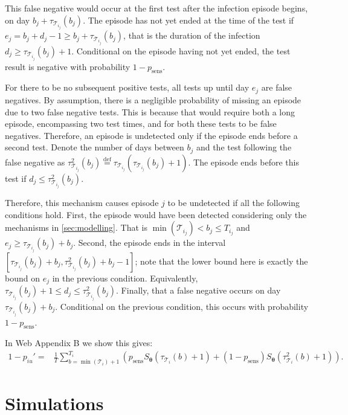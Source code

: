 \documentclass[referee,useAMS,usenatbib]{biom}
\renewcommand{\vec}[1]{\bm{#1}}
\newcommand{\psens}{p_\text{sens}}
\newcommand{\sched}{\mathcal{T}}
\begin{document}
This false negative would occur at the first test after the infection episode begins, on day $b_j + \tau_{\sched_{i_j}}(b_j)$.
The episode has not yet ended at the time of the test if $e_j = b_j + d_j - 1 \geq b_j + \tau_{\sched_{i_j}}(b_j)$, that is the duration of the infection $d_j \geq \tau_{\sched_{i_j}}(b_j) + 1$.
Conditional on the episode having not yet ended, the test result is negative with probability $1 - \psens$.

For there to be no subsequent positive tests, all tests up until day $e_j$ are false negatives.
By assumption, there is a negligible probability of missing an episode due to two false negative tests.
This is because that would require both a long episode, encompassing two test times, and for both these tests to be false negatives.
Therefore, an episode is undetected only if the episode ends before a second test.
Denote the number of days between $b_j$ and the test following the false negative as $\tau^2_{\sched_{i_j}}(b_j) \stackrel{\text{def}}{=} \tau_{\sched_{i_j}}(\tau_{\sched_{i_j}}(b_j) + 1)$.
The episode ends before this test if $d_j \leq \tau^2_{\sched_{i_j}}(b_j)$.

Therefore, this mechanism causes episode $j$ to be undetected if all the following conditions hold.
First, the episode would have been detected considering only the mechanisms in \cref{sec:modelling}.
That is $\min(\sched_{i_j}) < b_j \leq T_{i_j}$ and $e_j \geq \tau_{\sched_{i_j}}(b_j) + b_j$.
Second, the episode ends in the interval $[\tau_{\sched_{i_j}}(b_j) + b_j, \tau^2_{\sched_{i_j}}(b_j) + b_j - 1]$; note that the lower bound here is exactly the bound on $e_j$ in the previous condition.
Equivalently, $\tau_{\sched_{i_j}}(b_j) + 1 \leq d_j \leq \tau^2_{\sched_{i_j}}(b_j)$.
Finally, that a false negative occurs on day $\tau_{\sched_{i_j}}(b_j) + b_j$. Conditional on the previous condition, this occurs with probability $1 - \psens$.

In Web Appendix B we show this gives:
\begin{align}
1 - p_{iu}'
=& \frac{1}{T} \sum_{b=\min(\sched_{i}) + 1}^{T_{i}} \left( p_\text{sens} S_{\vec{\theta}}(\tau_{\sched_{i}}(b) + 1) + (1 - p_\text{sens}) S_{\vec{\theta}}(\tau^2_{\sched_{i}}(b) + 1)\right).
\label{imperf-test:eq:pit-prime}
\end{align}

\section{Simulations} \label{sec:simulation}
\end{document}
